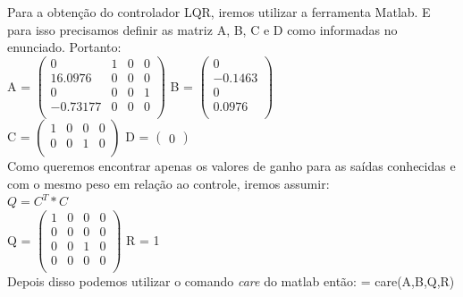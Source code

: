 \documentclass[a4paper]{article}
\begin{document}
Para a obtenção do controlador LQR, iremos utilizar a ferramenta Matlab. E para isso precisamos definir as matriz A, B, C e D como informadas no enunciado. Portanto:\\
\newline
A = $ \begin{pmatrix} 
0 & 1 & 0 & 0 \\ 16.0976 & 0 & 0 & 0 \\ 0 & 0 & 0 & 1 \\ -0.73177 & 0 & 0 & 0\\
\end{pmatrix}$ \qquad \qquad
B = $ \begin{pmatrix}
0 \\ -0.1463 \\ 0 \\ 0.0976\\
\end{pmatrix}$\\
\newline
\newline
C = $\begin{pmatrix}
1 & 0 & 0 & 0 \\ 0 & 0 & 1 & 0\\
\end{pmatrix}$ \qquad \qquad \qquad \qquad         D = $\begin{pmatrix}
0
\end{pmatrix}$\\
\newline
\newline
Como queremos encontrar apenas os valores de ganho para as saídas conhecidas e com o mesmo peso em relação ao controle, iremos assumir:\\
\(Q = C^{T}*C\)\\
\newline
Q = $\begin{pmatrix}
     1 & 0 & 0 &  0\\
     0 & 0 & 0 & 0\\
     0 & 0 & 1 & 0\\
     0 & 0 & 0 & 0\\
\end{pmatrix}$
\newline
\newline
\newline
R = 1\\
Depois disso podemos utilizar o comando \textit{care} do matlab então:
\newline
[P,L,K] = care(A,B,Q,R)\\
\end{document}
